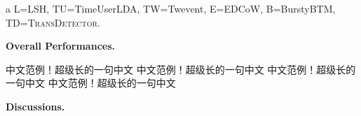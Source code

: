 \documentclass[runningheads,a4paper]{llncs}
\begin{document}
\begin{table}
{\begin{threeparttable}
\begin{tablenotes}  
\item[a] L=LSH\cite{Petrovic:2010uj}, TU=TimeUserLDA\cite{Diao:2012wj}, TW=Twevent\cite{Twevent2012}, E=EDCoW\cite{Weng:2011wz}, B=BurstyBTM\cite{Yan:2015wm}, TD=\textsc{TransDetector}.
\end{tablenotes}  
\end{threeparttable}  
}
\end{table}


\textbf{Overall Performances.}
\begin{CJK*}{UTF8}{gbsn}
    中文范例！超级长的一句中文    中文范例！超级长的一句中文    中文范例！超级长的一句中文    中文范例！超级长的一句中文
\end{CJK*}

\textbf{Discussions.} 

\end{document}

